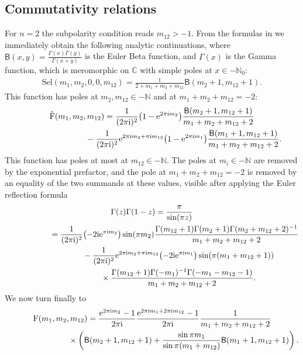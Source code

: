 \documentclass[10pt,a4paper]{amsart}
\numberwithin{equation}{section}
\newcommand{\N}{\mathbb{N}}
\newcommand{\C}{\mathbb{C}}
\renewcommand{\i}{\mathrm{i}}
\newcommand{\Sel}{\mathrm{Sel}}
\newcommand{\Fp}{\mathrm{F}}
\newcommand{\rFp}{\tilde{\mathrm{F}}}
\begin{document}
\subsection{Commutativity relations}\label{sec_commutativity}
\newcommand{\Beta}{\mathsf{B}}
For $n=2$ the subpolarity condition reads $m_{12}>-1$. From the formulas in \cite[Example~5.21]{Len17} we immediately obtain the following analytic continuations, where $\Beta(x,y)=\frac{\Gamma(x)\Gamma(y)}{\Gamma(x+y)}$ is the Euler Beta function, and $\Gamma(x)$ is the Gamma function, which is meromorphic on $\C$ with simple poles at $x\in-\N_0$:
\begin{gather*}
\Sel(m_1,m_2,0,0,m_{12})
=\frac{1}{2+m_1+m_2+m_{12}} \Beta(m_2+1,m_{12}+1).
\end{gather*}
This function has poles at $m_2,m_{12}\in -\N$ and at $m_1+m_2+m_{12}=-2$:
\begin{gather*}
\rFp(m_1,m_2,m_{12})=\frac{1}{(2\pi\i)^2}\big(1-{\rm e}^{2\pi\i m_2}\big)
	 \frac{\Beta(m_2+1,m_{12}+1)}{m_1+m_2+m_{12}+2}\\
\hphantom{\rFp(m_1,m_2,m_{12})=}{}
-\frac{1}{(2\pi\i)^2}{\rm e}^{2\pi\i m_2+\pi\i m_{12}}\big(1-{\rm e}^{2\pi\i m_1}\big)
	 \frac{\Beta(m_1+1,m_{12}+1)}{m_1+m_2+m_{12}+2}.
\end{gather*}
This function has poles at most at $m_{12}\in -\N$. The poles at $m_i\in-\N$ are removed by the exponential prefactor, and the pole at $m_1+m_2+m_{12}=-2$ is removed by an equality of the two summands at these values, visible after applying the Euler reflection formula
\begin{gather*}
\Gamma(z)\Gamma(1-z)=\frac{\pi}{\sin(\pi z)}\\
\hphantom{\Gamma(z)\Gamma(1-z)}{}
=\frac{1}{(2\pi\i)^2}\big({-}2\i {\rm e}^{\pi\i m_2}\big)\sin(\pi m_2) \frac{\Gamma(m_{12}+1)\Gamma(m_2+1)\Gamma(m_2+m_{12}+2)^{-1}}{m_1+m_2+m_{12}+2}\\
\hphantom{\Gamma(z)\Gamma(1-z)=}{}
-\frac{1}{(2\pi\i)^2}{\rm e}^{2\pi\i m_2+\pi\i m_{12}}\big({-}2\i {\rm e}^{\pi\i m_1}\big)\sin(\pi (m_1+m_{12}+1))\\
\hphantom{\Gamma(z)\Gamma(1-z)=}{}
\times\frac{\Gamma(m_{12}+1)\Gamma(-m_1)^{-1}\Gamma(-m_1-m_{12}-1)}{m_1+m_2+m_{12}+2}.
\end{gather*}
We now turn finally to
\begin{gather*}
\Fp(m_1,m_2,m_{12}) =\frac{{\rm e}^{2\pi\i m_2}-1}{2\pi\i}\frac{{\rm e}^{2\pi\i m_1+2\pi\i m_{12}}-1}{2\pi\i}
	 \frac{1}{m_1+m_2+m_{12}+2} \\
\hphantom{\Fp(m_1,m_2,m_{12}) =}{}
 \times \left(\Beta(m_2+1,m_{12}+1)+\frac{\sin\pi m_1}{\sin\pi(m_1+m_{12})}\Beta(m_1+1,m_{12}+1)\right).
\end{gather*}
\end{document}
